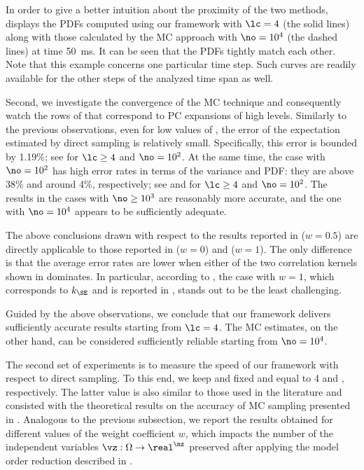 In order to give a better intuition about the proximity of the two methods,
 displays the \acp{PDF} computed using our
framework with $\lc = 4$ (the solid lines) along with those calculated by the
\ac{MC} approach with $\no = 10^4$ (the dashed lines) at time 50~ms. It can be
seen that the \acp{PDF} tightly match each other. Note that this example
concerns one particular time step. Such curves are readily available for the
other steps of the analyzed time span as well.

Second, we investigate the convergence of the \ac{MC} technique and consequently
watch the rows of  that correspond to \ac{PC}
expansions of high levels. Similarly to the previous observations, even for low
values of \no, the error of the expectation estimated by direct sampling is
relatively small. Specifically, this error is bounded by 1.19\%; see
\error{\expectation} for $\lc \geq 4$ and $\no = 10^2$. At the same time, the
case with $\no = 10^2$ has high error rates in terms of the variance and
\ac{PDF}: they are above 38\% and around 4\%, respectively; see
\error{\variance} and  for $\lc \geq 4$ and $\no = 10^2$. The results
in the cases with $\no \geq 10^3$ are reasonably more accurate, and the one with
$\no = 10^4$ appears to be sufficiently adequate.

The above conclusions drawn with respect to the results reported in
 ($w = 0.5$) are directly applicable to those
reported in  ($w = 0$) and
 ($w = 1$). The only difference is that the
average error rates are lower when either of the two correlation kernels shown
in  dominates. In particular, according to
\error{\variance}, the case with $w = 1$, which corresponds to $k_\SE$ and is
reported in , stands out to be the least
challenging.

Guided by the above observations, we conclude that our framework delivers
sufficiently accurate results starting from $\lc = 4$. The \ac{MC} estimates, on
the other hand, can be considered sufficiently reliable starting from $\no =
10^4$.


The second set of experiments is to measure the speed of our framework with
respect to direct sampling. To this end, we keep \lc and \no fixed and equal to
4 and , respectively. The latter value is also similar to those
used in the literature \cite{ghanta2006, bhardwaj2008, huang2009a, shen2009,
xiang2010, juan2012, lee2013} and consisted with the theoretical results on the
accuracy of \ac{MC} sampling presented in \cite{diaz-emparanza2002}. Analogous
to the previous subsection, we report the results obtained for different values
of the weight coefficient $w$, which impacts the number of the independent
variables $\vz: \Omega \to \real^\nz$ preserved after applying the model order
reduction described in .

